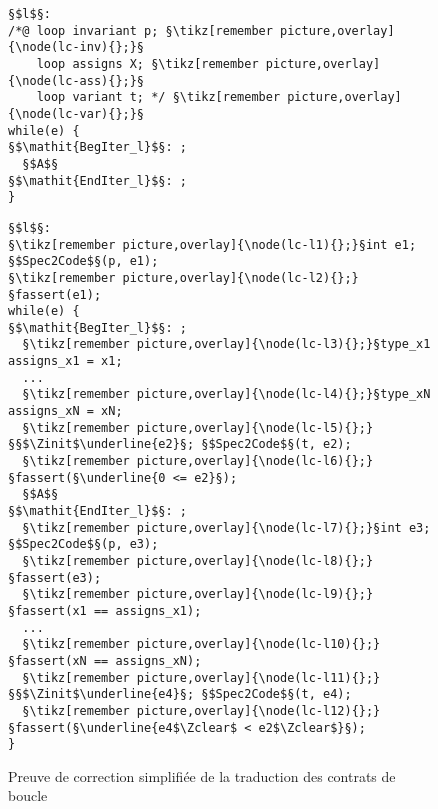 \begin{figure}[bt]
  \begin{minipage}{0.65\textwidth}
    \begin{lstlisting}[escapechar=§]
§$l$§:
/*@ loop invariant p; §\tikz[remember picture,overlay]{\node(lc-inv){};}§
    loop assigns X; §\tikz[remember picture,overlay]{\node(lc-ass){};}§
    loop variant t; */ §\tikz[remember picture,overlay]{\node(lc-var){};}§
while(e) {
§$\mathit{BegIter_l}$§: ;
  §$A$§
§$\mathit{EndIter_l}$§: ;
}
    \end{lstlisting}
  \end{minipage}\hfill
  \begin{minipage}{0.49\textwidth}
    \begin{lstlisting}[escapechar=§]
§$l$§:
§\tikz[remember picture,overlay]{\node(lc-l1){};}§int e1; §$Spec2Code$§(p, e1);
§\tikz[remember picture,overlay]{\node(lc-l2){};}§fassert(e1);
while(e) {
§$\mathit{BegIter_l}$§: ;
  §\tikz[remember picture,overlay]{\node(lc-l3){};}§type_x1 assigns_x1 = x1;
  ...
  §\tikz[remember picture,overlay]{\node(lc-l4){};}§type_xN assigns_xN = xN;
  §\tikz[remember picture,overlay]{\node(lc-l5){};}§§$\Zinit$\underline{e2}§; §$Spec2Code$§(t, e2);
  §\tikz[remember picture,overlay]{\node(lc-l6){};}§fassert(§\underline{0 <= e2}§);
  §$A$§
§$\mathit{EndIter_l}$§: ;
  §\tikz[remember picture,overlay]{\node(lc-l7){};}§int e3; §$Spec2Code$§(p, e3);
  §\tikz[remember picture,overlay]{\node(lc-l8){};}§fassert(e3);
  §\tikz[remember picture,overlay]{\node(lc-l9){};}§fassert(x1 == assigns_x1);
  ...
  §\tikz[remember picture,overlay]{\node(lc-l10){};}§fassert(xN == assigns_xN);
  §\tikz[remember picture,overlay]{\node(lc-l11){};}§§$\Zinit$\underline{e4}§; §$Spec2Code$§(t, e4);
  §\tikz[remember picture,overlay]{\node(lc-l12){};}§fassert(§\underline{e4$\Zclear$ < e2$\Zclear$}§);
}
    \end{lstlisting}
  \end{minipage}
  \caption{Preuve de correction simplifiée de la traduction des contrats de
    boucle}
  \label{fig:proof-loop-contract}
\end{figure}

